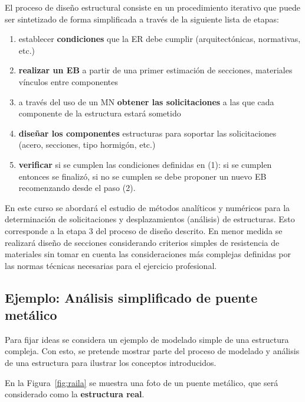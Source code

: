 El proceso de diseño estructural consiste en un procedimiento iterativo que puede ser sintetizado de forma simplificada a través de la siguiente lista de etapas:
%
\begin{enumerate}
  \item establecer \textbf{condiciones} que la ER debe cumplir (arquitectónicas, normativas, etc.)
  \item \textbf{realizar un EB} a partir de una primer estimación de secciones, materiales vínculos entre componentes
  \item a través del uso de un MN \textbf{obtener las solicitaciones} a las que cada componente de la estructura estará sometido
  \item \textbf{diseñar los componentes} estructuras para soportar las solicitaciones (acero, secciones, tipo hormigón, etc.) 
  \item \textbf{verificar} si se cumplen las condiciones definidas en (1): si se cumplen entonces se finalizó, si no se cumplen se debe proponer un nuevo EB recomenzando desde el paso (2).
\end{enumerate}


En este curso se abordará el estudio de métodos analíticos y numéricos para la determinación de solicitaciones y desplazamientos (análisis) de estructuras. %
Esto corresponde a la etapa 3 del proceso de diseño descrito. %
%
En menor medida se realizará diseño de secciones considerando criterios simples de resistencia de materiales sin tomar en cuenta las consideraciones más complejas definidas por las normas técnicas necesarias para el ejercicio profesional. %
%
%

\subsection{Ejemplo: Análisis simplificado de puente metálico}

Para fijar ideas se considera un ejemplo de modelado simple de una estructura compleja. %
%
Con esto, se pretende mostrar parte del proceso de modelado y análisis de una estructura para ilustrar los conceptos introducidos.

En la Figura~\ref{fig:raila} se muestra una foto de un puente metálico, que será considerado como la \textbf{estructura real}. %

